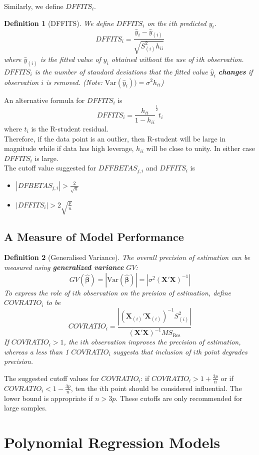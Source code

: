 \documentclass[11pt]{article}
\newcommand{\var}{\mathrm{Var}}
\newtheorem{definition}{Definition}[section]
\theoremstyle{definition}
\begin{document}
Similarly, we define $DFFITS_i$.
\begin{definition}[DFFITS]
\normalfont We define $DFFITS_i$ on the $i$th predicted $y_i$.
\[
DFFITS_i=\frac{\hat{y}_i-\hat{y}_{(i)}}{\sqrt{S_{(i)}^2h_{ii}}}
\]
where $\hat{y}_{(i)}$ is the fitted value of $y_i$ obtained without the use of $i$th observation.\\
$DFFITS_i$ is the number of standard deviations that the fitted value $\hat{y}_i$ \textbf{changes} if observation $i$ is removed. (Note: $\var(\hat{y}_i))=\sigma^2h_{ii}$)
\end{definition}
An alternative formula for $DFFITS_i$ is 
\[
DFFITS_i=\frac{h_{ii}}{1-h_{ii}}^{\frac{1}{2}}t_i
\]
where $t_i$ is the R-student residual.\\
Therefore, if the data point is an outlier, then R-student will be large in magnitude while if data has high leverage, $h_{ii}$ will be close to unity. In either case $DFFITS_i$ is large.\\
The cutoff value suggested for $DFFBETAS_{j,i}$ and $DFFITS_i$ is
\begin{itemize}
  \item $|DFBETAS_{j,i}|>\frac{2}{\sqrt{n}}$ 
  \item $|DFFITS_i|>2\sqrt{\frac{p}{n}}$
\end{itemize}
\subsection{A Measure of Model Performance}
\begin{definition}[Generalised Variance]
\normalfont The overall precision of estimation can be measured using \textbf{generalized variance} $GV$:
\[
GV(\hat{\bm{\beta}})=|\var(\hat{\bm{\beta}})|=|\sigma^2(\bm{X}'\bm{X})^{-1}|
\]
To express the role of $i$th observation on the preision of estimation, define $COVRATIO_i$ to be
\[
COVRATIO_i=\frac{|(\bm{X}_{(i)}'\bm{X}_{(i)})^{-1}S_{(i)}^2|}{(\bm{X}'\bm{X})^{-1}MS_\text{Res}}
\]
If $COVRATIO_i>1$, the $i$th observation improves the precision of estimation, whereas a less than 1 $COVRATIO_i$ suggesta that inclusion of $i$th point degrades precision.
\end{definition}
The suggested cutoff values for $COVRATIO_i$: if $COVRATIO_i>1+\frac{3p}{n}$ or if $COVRATIO_i<1-\frac{3p}{n}$, ten the $i$th point should be considered influential. The lower bound is appropriate if $n>3p$. These cutoffs are only recommended for large samples.
\section{Polynomial Regression Models}
\end{document}
